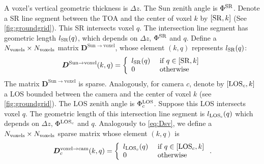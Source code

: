 \documentclass[10pt,letterpaper]{article}
\newcommand{\OpDistance}{\bm{D}}
\begin{document}
A voxel's vertical geometric thickness is $\Delta z$.  The Sun zenith
angle is $\Phi^{\rm SR}$. Denote a SR line segment between the TOA and
the center of voxel $k$ by $[{\rm SR},k]$ (See
\cref{fig:groundgrid}). This SR intersects voxel $q$. The intersection
line segment has geometric length $l_{\rm SR}(q)$, which depends on
$\Delta z$, $\Phi^{\rm SR}$ and $q$.  Define a $N_{\rm voxels}\times
N_{\rm voxels}$ matrix $\OpDistance^{\mathrm{Sun \rightarrow voxel}}$,
whose element $(k,q)$ represents $l_{\rm SR}(q)$:
\begin{equation}
  \OpDistance^{\mathrm{Sun \rightarrow voxel}}(k,q) =
  \left\{
    \begin{array}{ll}
      l_{\rm SR}(q) & \mbox{ if $q \in[{\rm SR},k]$} \\
      0  & \mbox{ otherwise}
      \label{eq:Dsv}
    \end{array}
  \right.
  \hspace{-0.05cm}
\end{equation}
The matrix $\OpDistance^{\mathrm{Sun \rightarrow voxel}}$ is sparse.
Analogously, for camera $c$, denote by $[{\rm LOS}_c,k]$ a LOS bounded
between the camera and the center of voxel $k$ (see
\cref{fig:groundgrid}).  The LOS zenith angle is $\Phi^{\rm LOS}_c$.
Suppose this LOS intersects voxel $q$. The geometric length of this
intersection line segment is $l_{\rm LOS_c}(q)$ which depends on
$\Delta z$, $\Phi^{{\rm LOS}_c}$ and $q$.  Analogously to
\cref{eq:Dsv}, we define a $N_{\rm voxels}\times N_{\rm voxels}$
sparse matrix whose element $(k,q)$ is
\begin{equation}
  \OpDistance^{\mathrm{voxel \rightarrow cam}}_c(k,q) =
  \left\{
    \begin{array}{ll}
      l_{{\rm LOS}_c}(q) & \mbox{ if $q \in[{\rm LOS}_c,k]$} \\
      0  & \mbox{ otherwise}
      \label{eq:Dvc}
    \end{array}
  \right.
  .
  \hspace{-0.05cm}
\end{equation}
\end{document}
